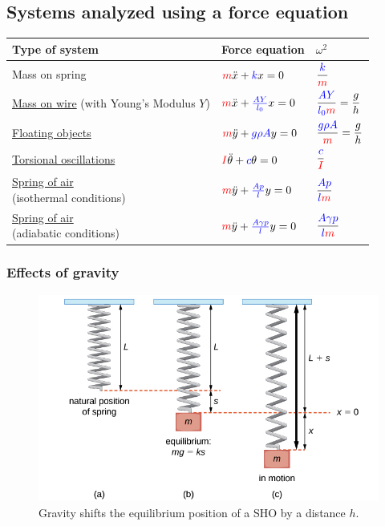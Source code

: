 \documentclass[11pt,letterpaper,titlepage,oneside]{book}
\newcommand{\kcol}[1]{\textcolor{blue}{#1}}
\newcommand{\mcol}[1]{\textcolor{red}{#1}}
\begin{document}
\subsection{Systems analyzed using a force equation}
\begin{center}
	\renewcommand{\arraystretch}{2.5}
\begin{tabular}{lll}
	\hline
	Type of system & Force equation & $\omega^2$ \\ \hline
	Mass on spring &
		$\mcol{m}\ddot{x} + \kcol{k}x = 0$ &
		$\dfrac{\kcol{k}}{\mcol{m}}$
		\\
	\parbox{4cm}{\hyperref[ch3:sec-wire]{Mass on wire} \\\footnotesize{(with Young's Modulus $Y$)}} &
		$\mcol{m}\ddot{x} + \kcol{\frac{AY}{l_0}}x = 0$ &
		$\dfrac{\kcol{AY}}{\kcol{l_0}\mcol{m}} = \dfrac{g}{h}$ 
		\\
	\hyperref[ch3:sec-floating]{Floating objects} &
		$\mcol{m}\ddot{y} + \kcol{g\rho A}y = 0$ &
		$\dfrac{\kcol{g\rho A}}{\mcol{m}} = \dfrac{g}{h}$ 
		\\
	\hyperref[ch3:sec-torsional]{Torsional oscillations} &
		$\mcol{I}\ddot{\theta} + \kcol{c}\theta = 0$ &
		$\dfrac{\kcol{c}}{\mcol{I}}$ 
		\\
	\parbox{3.5cm}{\hyperref[ch3:sec-air]{Spring of air} \\\footnotesize{(isothermal conditions)}} &
		$\mcol{m}\ddot{y} + \kcol{\frac{Ap}{l}}y = 0$ &
		$\dfrac{\kcol{Ap}}{\kcol{l}\mcol{m}}$ 
		\\
	\parbox{3.5cm}{\hyperref[ch3:sec-air]{Spring of air} \\\footnotesize{(adiabatic conditions)}} &
		$\mcol{m}\ddot{y} + \kcol{\frac{A\gamma p}{l}}y = 0$ &
		$\dfrac{\kcol{A\gamma p}}{\kcol{l}\mcol{m}}$ 
		\\
	\hline
\end{tabular}
\renewcommand{\arraystretch}{1}
\end{center}


\subsubsection{Effects of gravity}

\begin{figure}[h]
	\centering
	\includegraphics[scale=0.4]{phys232/Ch3-g-new-eqm} \caption{Gravity shifts the equilibrium position of a SHO by a distance $h$.}\label{ch3:fig-g-new-eqm-pos}
\end{figure}
\end{document}
